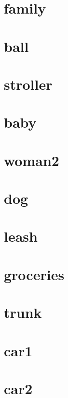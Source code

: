 \documentclass[
]{book}
\begin{document}
\hypertarget{family}{%
\section{family}\label{family}}

\hypertarget{ball}{%
\section{ball}\label{ball}}

\hypertarget{stroller}{%
\section{stroller}\label{stroller}}

\hypertarget{baby}{%
\section{baby}\label{baby}}

\hypertarget{woman2}{%
\section{woman2}\label{woman2}}

\hypertarget{dog}{%
\section{dog}\label{dog}}

\hypertarget{leash}{%
\section{leash}\label{leash}}

\hypertarget{groceries}{%
\section{groceries}\label{groceries}}

\hypertarget{trunk}{%
\section{trunk}\label{trunk}}

\hypertarget{car1}{%
\section{car1}\label{car1}}

\hypertarget{car2}{%
\section{car2}\label{car2}}
\end{document}
